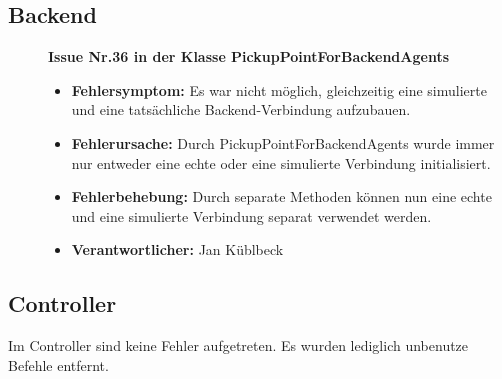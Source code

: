 \documentclass[parskip=full]{scrartcl}
\begin{document}
\clearpage
\subsection{Backend}

\begin{description}

\item []\textbf{Issue Nr.36 in der Klasse PickupPointForBackendAgents} 

\begin{itemize}
\item []\textbf{Fehlersymptom:} Es war nicht möglich, gleichzeitig eine simulierte und eine tatsächliche Backend-Verbindung aufzubauen.
\item []\textbf{Fehlerursache:} Durch PickupPointForBackendAgents wurde immer nur entweder eine echte oder eine simulierte Verbindung initialisiert.
\item []\textbf{Fehlerbehebung:} Durch separate Methoden können nun eine echte und eine simulierte Verbindung separat verwendet werden.
\item []\textbf{Verantwortlicher:} Jan Küblbeck
\end{itemize}

\end{description}


\clearpage
\subsection{Controller}
Im Controller sind keine Fehler aufgetreten. Es wurden lediglich unbenutze Befehle entfernt.

\clearpage
\end{document}
